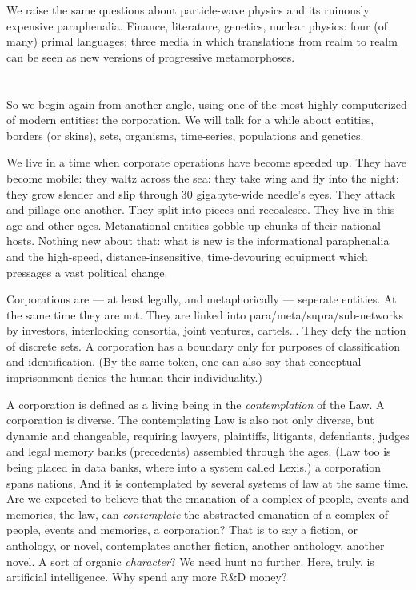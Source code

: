 \documentclass[11pt,twoside,draft]{memoir}
\begin{document}
We raise the same questions about particle-wave physics and its ruinously expensive paraphenalia.
Finance, literature, genetics, nuclear physics: four (of many) primal languages; three
media in which translations from realm to realm can be seen as new versions of progressive metamorphoses.

\chapter{}

So we begin again from another angle,
using one of the most highly computerized
of modern entities: the corporation. We will
talk for a while about entities, borders (or
skins), sets, organisms, time-series, populations and genetics.

We live in a time when corporate operations have become speeded up. They have
become mobile: they waltz across the sea:
they take wing and fly into the night: they
grow slender and slip through 30 gigabyte-wide needle's eyes. They attack and pillage
one another. They split into pieces and recoalesce. They live in this age and other
ages. Metanational entities gobble up chunks
of their national hosts. Nothing new about
that: what is new is the informational paraphenalia and the high-speed, distance-insensitive, time-devouring equipment which
pressages a vast political change.

Corporations are --- at least legally, and
metaphorically --- seperate entities. At the
same time they are not. They are linked into
para/meta/supra/sub-networks by investors,
interlocking consortia,
joint ventures, cartels... They defy the notion of discrete sets.
A corporation has a boundary only for purposes of classification and identification.
(By the same token, one can also say that
conceptual imprisonment denies the human
their individuality.)

A corporation is defined as a living being
in the \emph{contemplation} of the Law. A corporation is diverse. The contemplating Law is
also not only diverse, but dynamic and
changeable, requiring lawyers, plaintiffs,
litigants, defendants, judges and legal memory banks (precedents) assembled through
the ages. (Law too is being placed in data
banks, where into a system called Lexis.)
a corporation spans nations,
And it is contemplated by several systems of law at
the same time. Are we expected to believe
that the emanation of a complex of people,
events and memories, the law, can \emph{contemplate} the abstracted emanation of a complex
of people, events and memorigs, a corporation? That is to say a fiction, or anthology, or
novel, contemplates another fiction, another
anthology, another novel. A sort of organic
\emph{character}? We need hunt no further. Here,
truly, is artificial intelligence. Why spend
any more R\&D money?
\end{document}

